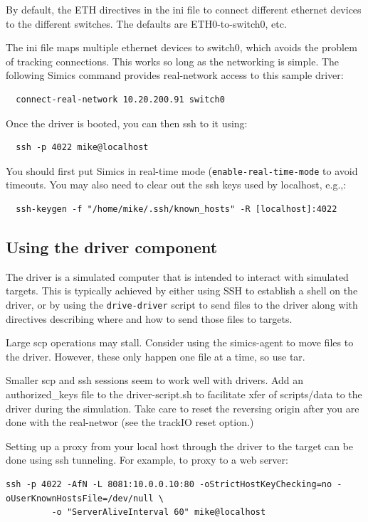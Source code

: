 \documentclass[titlepage]{article}
\begin{document}
\begin{appendices}
By default, the ETH directives in the ini file to connect different ethernet devices to the
different switches.  The defaults are ETH0-to-switch0, etc.

The ini file maps multiple ethernet devices to switch0, which avoids the problem of
tracking connections.  This works so long as the networking is simple.
The following Simics command provides real-network access to this sample driver:
\begin{verbatim}
  connect-real-network 10.20.200.91 switch0
\end{verbatim}
Once the driver is booted, you can then ssh to it using:
\begin{verbatim}
  ssh -p 4022 mike@localhost
\end{verbatim}
You should first put Simics in real-time mode ({\tt enable-real-time-mode} to avoid timeouts.  You may also need to clear out the
ssh keys used by localhost, e.g.,:
\begin{verbatim}
  ssh-keygen -f "/home/mike/.ssh/known_hosts" -R [localhost]:4022
\end{verbatim}

\subsection{Using the driver component}
The driver is a simulated computer that is intended to interact with simulated targets.  This is typically
achieved by either using SSH to establish a shell on the driver, or by using the {\tt drive-driver}
script to send files to the driver along with directives describing where and how to send those files to
targets.  

Large scp operations may stall.  Consider using the simics-agent to move files to the driver.  However,
these only happen one file at a time, so use tar.

Smaller scp and ssh sessions seem to work well with drivers.  Add an authorized\_keys file to the driver-script.sh to facilitate xfer of scripts/data to the driver
during the simulation.  Take care to reset the reversing origin after you are done with the real-networ (see the trackIO reset option.)

Setting up a proxy from your local host through the driver to the target can be done using ssh tunneling.  For example, to proxy to a web server:
\begin{verbatim}
ssh -p 4022 -AfN -L 8081:10.0.0.10:80 -oStrictHostKeyChecking=no -oUserKnownHostsFile=/dev/null \
         -o "ServerAliveInterval 60" mike@localhost
\end{verbatim}


\end{appendices}
\end{document}
